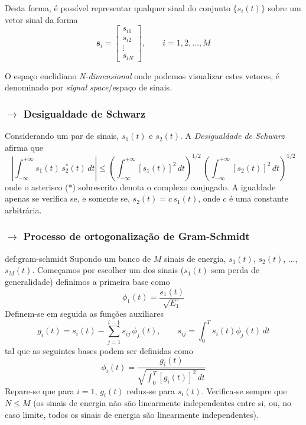 \noindent Desta forma, é possível representar qualquer sinal do conjunto $\{s_i(t)\}$ sobre um vetor sinal da forma
$$
    \pmb{s}_i = 
    \begin{bmatrix}
        s_{i1}\\
        s_{i2}\\
        \vdots\\
        s_{iN}
    \end{bmatrix},\qquad i = 1,2,\dots,M
$$

\noindent O espaço euclidiano \textit{N-dimensional} onde podemos visualizar estes vetores, é denominado por \textit{signal space}/espaço de sinais.
\newpage
\subsubsection[4.1.1 Desigualdade de Schwarz]{$\rightarrow$ Desigualdade de Schwarz}
\label{subsubsec:shwarz}

\begin{mdframed}
Considerando um par de sinais, $s_1(t)$ e $s_2(t)$. A \textit{Desigualdade de Schwarz} afirma que
$$
    \left| \int_{-\infty}^{+\infty} s_1(t)\, s_2^*(t) \, dt \right| \leq \left( \int_{-\infty}^{+\infty} [s_1(t)]^2 \, dt \right)^{1/2}\, \left( \int_{-\infty}^{+\infty} [s_2(t)]^2 \, dt \right)^{1/2}
$$
onde o asterisco ($*$) sobrescrito denota o complexo conjugado. A igualdade apenas se verifica se, e somente se, $s_2(t) = c\, s_1(t)$, onde $c$ é uma constante arbitrária.
\end{mdframed}

\subsubsection[4.1.2 Processo de ortogonalização de Gram-Schmidt]{$\rightarrow$ Processo de ortogonalização de Gram-Schmidt}

\begin{theo}{def:gram-schmidt}\label{def:gram-schmidt}
    Supondo um banco de $M$ sinais de energia, $s_1(t)$, $s_2(t)$, $\dots$, $s_M(t)$. Começamos por escolher um dos sinais ($s_1(t)$ sem perda de generalidade) definimos a primeira base como
    $$
        \phi_1(t) = \frac{s_1(t)}{\sqrt{E_1}}
    $$
    Definem-se em seguida as funções auxiliares
    $$
        g_i(t) = s_i(t) - \sum_{j=1}^{i-1} s_{ij}\, \phi_{j}(t),\qquad s_{ij} = \int_{0}^{T} s_i(t)\phi_j(t) \,dt 
    $$
    tal que as seguintes bases podem ser definidas como
    $$
        \phi_i(t) = \frac{g_i(t)}{\sqrt{\int_{0}^{T} [g_i(t)]^2\, dt}}
    $$
    Repare-se que para $i=1$, $g_i(t)$ reduz-se para $s_i(t)$. Verifica-se sempre que $N \leq M$ (os sinais de energia não são linearmente independentes entre si, ou, no caso limite, todos os sinais de energia são linearmente independentes).
\end{theo}

